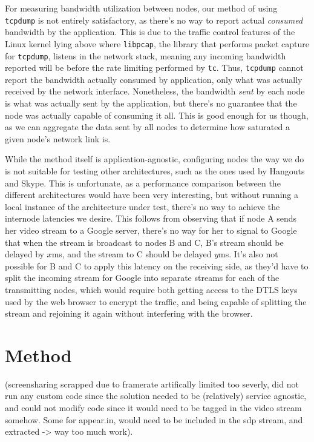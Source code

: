 For measuring bandwidth utilization between nodes, our method of using \texttt{tcpdump} is not entirely satisfactory, as there's no way to report actual \emph{consumed} bandwidth by the application. This is due to the traffic control features of the Linux kernel lying above where \texttt{libpcap}, the library that performs packet capture for \texttt{tcpdump}, listens in the network stack, meaning any incoming bandwidth reported will be before the rate limiting performed by \texttt{tc}. Thus, \texttt{tcpdump} cannot report the bandwidth actually consumed by application, only what was actually received by the network interface. Nonetheless, the bandwidth \emph{sent} by each node is what was actually sent by the application, but there's no guarantee that the node was actually capable of consuming it all. This is good enough for us though, as we can aggregate the data sent by all nodes to determine how saturated a given node's network link is.

While the method itself is application-agnostic, configuring nodes the way we do is not suitable for testing other architectures, such as the ones used by Hangouts and Skype. This is unfortunate, as a performance comparison between the different architectures would have been very interesting, but without running a local instance of the architecture under test, there's no way to achieve the internode latencies we desire. This follows from observing that if node A sends her video stream to a Google server, there's no way for her to signal to Google that when the stream is broadcast to nodes B and C, B's stream should be delayed by $x$ms, and the stream to C should be delayed $y$ms. It's also not possible for B and C to apply this latency on the receiving side, as they'd have to split the incoming stream for Google into separate streams for each of the transmitting nodes, which would require both getting access to the DTLS keys used by the web browser to encrypt the traffic, and being capable of splitting the stream and rejoining it again without interfering with the browser.


\section{Method}\label{sec:method}

(screensharing scrapped due to framerate artifically limited too severly, did not run any custom code since the solution needed to be (relatively) service agnostic, and could not modify code since it would need to be tagged in the video stream somehow. Some for appear.in, would need to be included in the sdp stream, and extracted -> way too much work).


